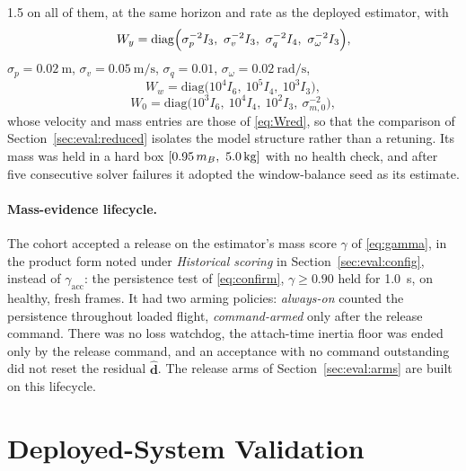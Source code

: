 \begin{spacing}{1.5}
on all of them, at the same horizon and rate as the deployed estimator, with
\begin{equation}
W_y = \mathrm{diag}\Bigl(\sigma_p^{-2}I_3,\ \sigma_v^{-2}I_3,\ \sigma_q^{-2}I_4,\ \sigma_\omega^{-2}I_3\Bigr),
\label{eq:Wy}
\end{equation}
$\sigma_p=\SI{0.02}{\meter}$, $\sigma_v=\SI{0.05}{\meter\per\second}$,
$\sigma_q=0.01$, $\sigma_\omega=\SI{0.02}{\radian\per\second}$,
\begin{equation}
W_w = \mathrm{diag}\bigl(10^{4} I_6,\ 10^{5} I_4,\ 10^{3} I_3\bigr),
\label{eq:Ww}
\end{equation}
\begin{equation}
W_0 = \mathrm{diag}\bigl(10^{3} I_6,\ 10^{4} I_4,\ 10^{2} I_3,\ \sigma_{m,0}^{-2}\bigr),
\label{eq:W0}
\end{equation}
whose velocity and mass entries are those of \eqref{eq:Wred}, so that the
comparison of Section~\ref{sec:eval:reduced} isolates the model structure rather
than a retuning. Its mass was held in a hard box $[0.95\,\mB,\ \SI{5.0}{\kg}]$
with no health check, and after five consecutive solver failures it adopted the
window-balance seed as its estimate.

\paragraph{Mass-evidence lifecycle.} The cohort accepted a release on the
estimator's mass score $\gamma$ of \eqref{eq:gamma}, in the product form noted
under \emph{Historical scoring} in Section~\ref{sec:eval:config}, instead of
$\gamma_{\mathrm{acc}}$: the persistence test of \eqref{eq:confirm},
$\gamma\ge0.90$ held for \SI{1.0}{\second}, on healthy, fresh frames. It had two
arming policies: \emph{always-on} counted the persistence throughout loaded
flight, \emph{command-armed} only after the release command. There was no loss
watchdog, the attach-time inertia floor was ended only by the release command,
and an acceptance with no command outstanding did not reset the residual
$\hat{\bm d}$. The release arms of Section~\ref{sec:eval:arms} are built on this
lifecycle.

\section{Deployed-System Validation}\label{sec:eval:deployed}


\end{spacing}
